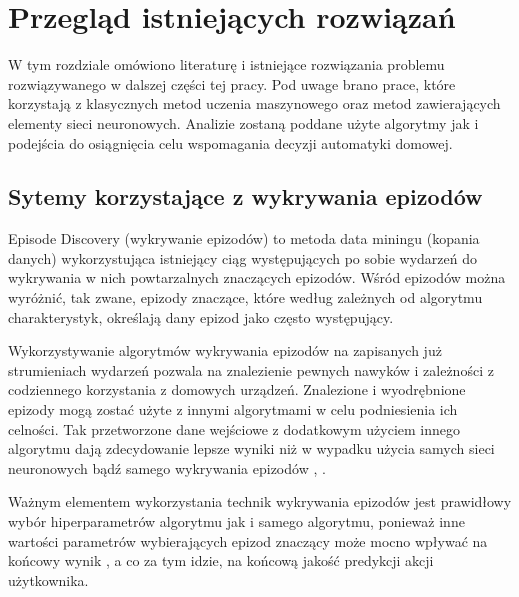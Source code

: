 
\chapter{Przegląd istniejących rozwiązań}

W tym rozdziale omówiono literaturę i istniejące rozwiązania problemu rozwiązywanego w dalszej części tej pracy. Pod uwage brano prace, które korzystają z klasycznych metod uczenia maszynowego oraz metod zawierających elementy sieci neuronowych. Analizie zostaną poddane użyte algorytmy jak i podejścia do osiągnięcia celu wspomagania decyzji automatyki domowej.


\section{Sytemy korzystające z wykrywania epizodów}
Episode Discovery (wykrywanie epizodów) to metoda data miningu (kopania danych) wykorzystująca istniejący ciąg występujących po sobie wydarzeń do wykrywania w nich powtarzalnych znaczących epizodów. Wśród epizodów można wyróżnić, tak zwane, epizody znaczące, które według zależnych od algorytmu charakterystyk, określają dany epizod jako często występujący.

Wykorzystywanie algorytmów wykrywania epizodów na zapisanych już strumieniach wydarzeń pozwala na znalezienie pewnych nawyków i zależności z codziennego korzystania z domowych urządzeń. Znalezione i wyodrębnione epizody mogą zostać użyte z innymi algorytmami w celu podniesienia ich celności. Tak przetworzone dane wejściowe z dodatkowym użyciem innego algorytmu dają zdecydowanie lepsze wyniki niż w wypadku użycia samych sieci neuronowych bądź samego wykrywania epizodów \cite{episode_discovery_1}, \cite{episode_discovery_2}. 


Ważnym elementem wykorzystania technik wykrywania epizodów jest prawidłowy wybór hiperparametrów algorytmu jak i samego algorytmu, ponieważ inne wartości parametrów wybierających epizod znaczący może mocno wpływać na końcowy wynik \cite{episode_discovery_2}, a co za tym idzie, na końcową jakość predykcji akcji użytkownika.


